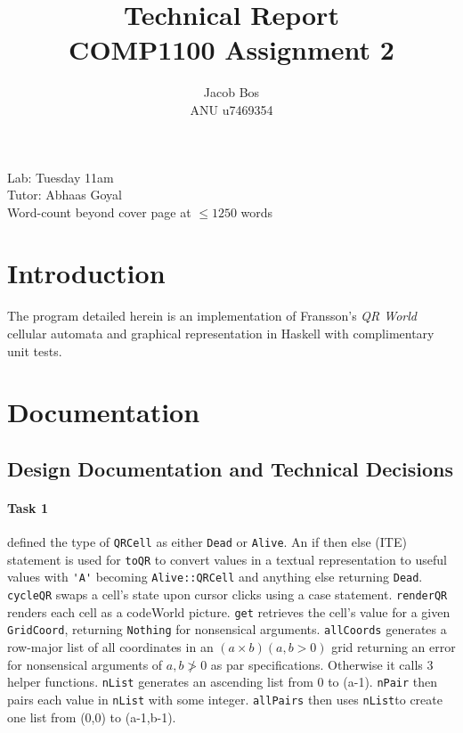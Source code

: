\documentclass[11pt]{article}
\title{Technical Report\\ COMP1100 Assignment 2}
\author{Jacob Bos\\ ANU u7469354}
\begin{document}
\maketitle
{}
\begin{center}
  Lab: Tuesday 11am\\
  Tutor: Abhaas Goyal\\
  Word-count beyond cover page at $\leq 1250$ words
\end{center}
\tableofcontents
\newpage
{}
\section{Introduction} 
The program detailed herein is an implementation of Fransson's \textit{QR World} cellular automata and graphical representation in Haskell with complimentary unit tests.


\section{Documentation}%
\subsection{Design Documentation and Technical Decisions}
\paragraph{Task 1}  defined the type of  \verb|QRCell| as either \verb|Dead| or \verb|Alive|.  An if then else (ITE) statement is used for \verb|toQR| to convert values in a textual representation to useful values with \verb|'A'| becoming \verb|Alive::QRCell| and anything else returning \verb|Dead|. \verb|cycleQR| swaps a cell's state upon cursor clicks using a case statement. \verb|renderQR| renders each cell as a codeWorld picture. \verb|get| retrieves the cell's value for a given \verb|GridCoord|, returning \verb|Nothing| for nonsensical arguments. \verb|allCoords| generates a row-major list of all coordinates in an $(a\times b)(a,b>0)$ grid returning an error for nonsensical arguments of $a,b\not>0$ as par specifications. Otherwise it calls 3 helper functions. \verb|nList| generates an ascending list from 0 to (a-1). \verb|nPair| then pairs each value in  \verb|nList| with some integer. \verb|allPairs| then uses \verb|nList|to create one list from (0,0) to (a-1,b-1). 
\end{document}
